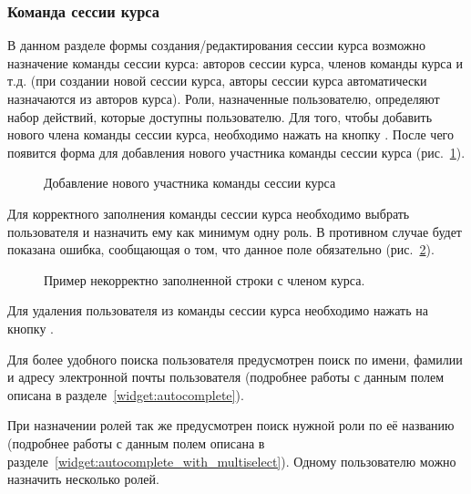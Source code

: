 \subsubsection{Команда сессии курса}
	В данном разделе формы создания/редактирования сессии курса возможно назначение команды сессии курса: авторов сессии курса, членов команды курса и т.д. (при создании новой сессии курса, авторы сессии курса автоматически назначаются из авторов курса). Роли, назначенные пользователю, определяют набор действий, которые доступны пользователю. Для того, чтобы добавить нового члена команды сессии курса, необходимо нажать на кнопку . После чего появится форма для добавления нового участника команды сессии курса (рис.~\ref{img:course_session:new_member}).
	\begin{figure}[H]
		\caption{Добавление нового участника команды сессии курса}
		\label{img:course_session:new_member}
	\end{figure}
	Для корректного заполнения команды сессии курса необходимо выбрать пользователя и назначить ему как минимум одну роль. В противном случае будет показана ошибка, сообщающая о том, что данное поле обязательно (рис.~\ref{img:course_session:course_session_team_error}).
	\begin{figure}[H]
		\caption{Пример некорректно заполненной строки с членом курса.}
		\label{img:course_session:course_session_team_error}
	\end{figure}
	
	Для удаления пользователя из команды сессии курса необходимо нажать на кнопку .
	
	Для более удобного поиска пользователя предусмотрен поиск по имени, фамилии и адресу электронной почты пользователя (подробнее работы с данным полем описана в разделе~\ref{widget:autocomplete}).
	
	При назначении ролей так же предусмотрен поиск нужной роли по её названию (подробнее работы с данным полем описана в разделе~\ref{widget:autocomplete_with_multiselect}).
	Одному пользователю можно назначить несколько ролей.
	
